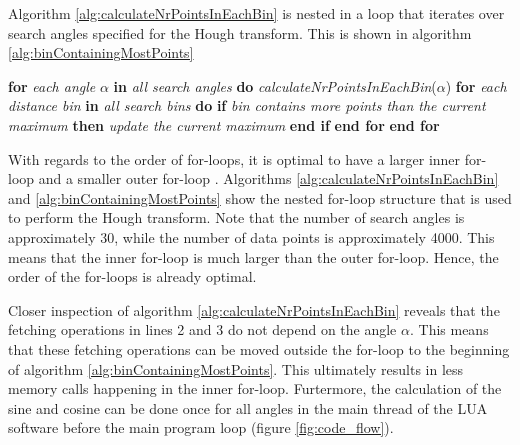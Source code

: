 Algorithm \ref{alg:calculateNrPointsInEachBin} is nested in a loop that iterates over search angles specified for the Hough transform.  This is shown in algorithm \ref{alg:binContainingMostPoints}

\begin{algorithm}
    \begin{algorithmic}[1]
        \State \textbf{for} \textit{each angle} $\alpha$ \textbf{in} \textit{all search angles} \textbf{do}
        \State \hspace{1cm} \textit{calculateNrPointsInEachBin}($\alpha$)
        \State  \hspace{1cm} \textbf{for} \textit{each distance bin} \textbf{in} \textit{all search bins} \textbf{do}
        \State \hspace{2cm} \textbf{if} \textit{bin contains more points than the current maximum} \textbf{then}
        \State \hspace{3cm} \textit{update the current maximum}
        \State \hspace{2cm} \textbf{end if}
        \State \hspace{1cm} \textbf{end for}
        \State \textbf{end for}
        \EndFunction
    \end{algorithmic}
    \caption{Pseudo code of the function \lstinline[language=c]|LineFinder::calculateBinContainingMostPoints|.}
    \label{alg:binContainingMostPoints}
\end{algorithm}

With regards to the order of for-loops, it is optimal to have a larger inner for-loop and a smaller outer for-loop \cite[lecture 7, "temporal locality" ]{scientific_programming}. Algorithms \ref{alg:calculateNrPointsInEachBin} and \ref{alg:binContainingMostPoints} show the nested for-loop structure that is used to perform the Hough transform. Note that the number of search angles is approximately 30, while the number of data points is approximately 4000. This means that the inner for-loop is much larger than the outer for-loop. Hence, the order of the for-loops is already optimal.

Closer inspection of algorithm \ref{alg:calculateNrPointsInEachBin} reveals that the fetching operations in lines 2 and 3 do not depend on the angle $\alpha$. This means that these fetching operations can be moved outside the for-loop to the beginning of algorithm \ref{alg:binContainingMostPoints}. This ultimately results in less memory calls happening in the inner for-loop. Furtermore, the calculation of the sine and cosine can be done once for all angles in the main thread of the LUA software before the main program loop (figure \ref{fig:code_flow}).

